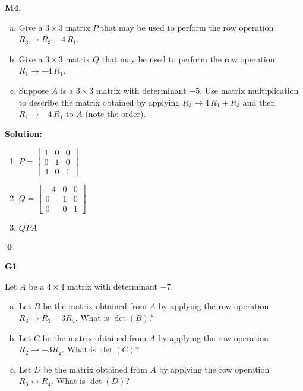 \documentclass{article}
\newenvironment{problem}[1]
{
  \begin{flushleft}
  \textbf{#1}.
  \ignorespaces
}
{
  \end{flushleft}
}
\newenvironment{solution}
{
  \ignorespaces
  \textbf{Solution:}
}
{
  \ignorespacesafterend
  \begin{flushright}
  {\bfseries \qed}
  \end{flushright}
}
\begin{document}
\begin{problem}{M4}
\begin{enumerate}[(a)]
\item Give a \(3\times 3\) matrix \(P\) that may be used to perform the row
      operation \({R_3} \to R_3+4 \, {R_1} \).
\item Give a \(3\times 3\) matrix \(Q\) that may be used to perform the row
      operation \({R_1} \to -4 \, {R_1}\).
\item Suppose \(A\) is a \(3\times 3\) matrix with determinant \(-5\).
      Use matrix multiplication to describe the matrix obtained by applying 
        \({R_3} \to 4 \, {R_1} + {R_3}\) and then \({R_1} \to -4 \, {R_1}\)
      to \(A\) (note the order).
\end{enumerate}
\end{problem}
\begin{solution}
\begin{enumerate}
\item 
\(P=\begin{bmatrix} 1 & 0 & 0 \\ 0 & 1 & 0 \\ 4 & 0 & 1 \end{bmatrix}\)
\item
\(Q=\begin{bmatrix} -4 & 0 & 0 \\ 0 & 1 & 0 \\ 0 & 0 & 1 \end{bmatrix}\)
\item \( QPA\)
\end{enumerate}
\end{solution}

\begin{problem}{G1}
Let \(A\) be a \(4 \times 4\) matrix with determinant \(-7\).
\begin{enumerate}[(a)]
\item Let \(B\) be the matrix obtained from \(A\) by applying the row operation \(R_3 \to R_3+3R_4\). What is \(\det(B)\)?
\item Let \(C\) be the matrix obtained from \(A\) by applying the row operation \(R_2 \to -3R_2\). What is \(\det(C)\)?
\item Let \(D\) be the matrix obtained from \(A\) by applying the row operation \(R_3 \leftrightarrow R_4\). What is \(\det(D)\)?
\end{enumerate}
\end{problem}
\end{document}
